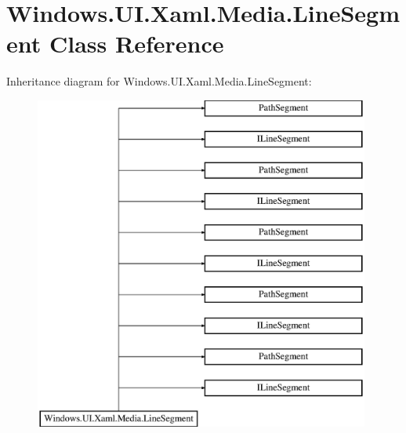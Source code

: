 \hypertarget{class_windows_1_1_u_i_1_1_xaml_1_1_media_1_1_line_segment}{}\section{Windows.\+U\+I.\+Xaml.\+Media.\+Line\+Segment Class Reference}
\label{class_windows_1_1_u_i_1_1_xaml_1_1_media_1_1_line_segment}
Inheritance diagram for Windows.\+U\+I.\+Xaml.\+Media.\+Line\+Segment\+:\begin{figure}[H]
\begin{center}
\leavevmode
\includegraphics[height=11.000000cm]{class_windows_1_1_u_i_1_1_xaml_1_1_media_1_1_line_segment}
\end{center}
\end{figure}

